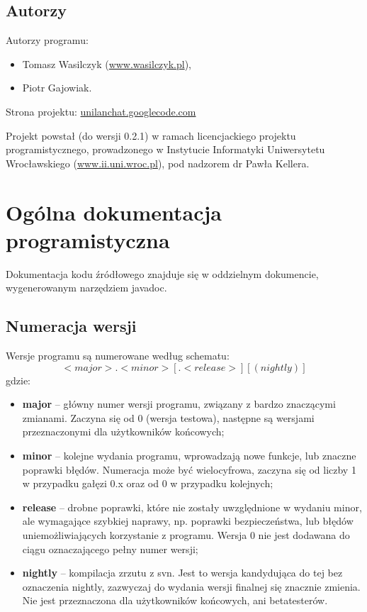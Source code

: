 \documentclass[11pt,leqno]{article}
\begin{document}
\subsection{Autorzy}

Autorzy programu:
\begin{itemize}
	\item Tomasz Wasilczyk (\href{http://www.wasilczyk.pl}{www.wasilczyk.pl}),
	\item Piotr Gajowiak.
\end{itemize}

Strona projektu: \href{http://unilanchat.googlecode.com}{unilanchat.googlecode.com}

Projekt powstał (do wersji 0.2.1) w ramach licencjackiego projektu
programistycznego, prowadzonego w Instytucie Informatyki Uniwersytetu
Wrocławskiego (\href{http://www.ii.uni.wroc.pl}{www.ii.uni.wroc.pl}), pod
nadzorem dr Pawła Kellera.


\section{Ogólna dokumentacja programistyczna}

Dokumentacja kodu źródłowego znajduje się w oddzielnym dokumencie, wygenerowanym narzędziem javadoc.

\subsection{Numeracja wersji}

Wersje programu są numerowane według schematu:
\[
<major>.<minor>[.<release>][ (nightly)]
\]
gdzie:
\begin{itemize}
	\item \textbf{major} -- główny numer wersji programu, związany z bardzo znaczącymi zmianami.
	Zaczyna się od 0 (wersja testowa), następne są wersjami przeznaczonymi dla użytkowników
	końcowych;
	\item \textbf{minor} -- kolejne wydania programu, wprowadzają nowe funkcje, lub znaczne
	poprawki błędów. Numeracja może być wielocyfrowa, zaczyna się od liczby
	1 w przypadku gałęzi 0.x oraz od 0 w przypadku kolejnych;
	\item \textbf{release} -- drobne poprawki, które nie zostały uwzględnione w wydaniu minor,
	ale wymagające szybkiej naprawy, np. poprawki bezpieczeństwa, lub błędów
	uniemożliwiających korzystanie z programu. Wersja 0 nie jest dodawana
	do ciągu oznaczającego pełny numer wersji;
	\item \textbf{nightly} -- kompilacja zrzutu z svn. Jest to wersja kandydująca do tej bez
	oznaczenia nightly, zazwyczaj do wydania wersji finalnej się znacznie
	zmienia. Nie jest przeznaczona dla użytkowników końcowych, ani betatesterów.
\end{itemize}
\end{document}
